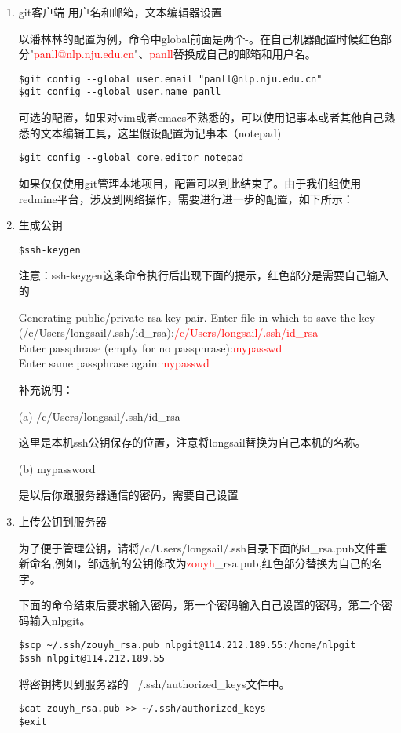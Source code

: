 \begin{enumerate}
\item git客户端 用户名和邮箱，文本编辑器设置

以潘林林的配置为例，命令中global前面是两个-。在自己机器配置时候红色部分"\textcolor{red}{panll@nlp.nju.edu.cn}"、\textcolor{red}{panll}替换成自己的邮箱和用户名。

\begin{lstlisting}
$git config --global user.email "panll@nlp.nju.edu.cn"
$git config --global user.name panll
\end{lstlisting}

可选的配置，如果对vim或者emacs不熟悉的，可以使用记事本或者其他自己熟悉的文本编辑工具，这里假设配置为记事本（notepad)
\begin{lstlisting}
$git config --global core.editor notepad
\end{lstlisting}

如果仅仅使用git管理本地项目，配置可以到此结束了。由于我们组使用redmine平台，涉及到网络操作，需要进行进一步的配置，如下所示：

\item 生成公钥

\begin{lstlisting}
$ssh-keygen
\end{lstlisting}
注意：ssh-keygen这条命令执行后出现下面的提示，红色部分是需要自己输入的

Generating public/private rsa key pair.
Enter file in which to save the key (/c/Users/longsail/.ssh/id\_rsa):\textcolor{red}{/c/Users/longsail/.ssh/id\_rsa}\\
Enter passphrase (empty for no passphrase):\textcolor{red}{mypasswd}\\
Enter same passphrase again:\textcolor{red}{mypasswd}

补充说明：

(a) /c/Users/longsail/.ssh/id\_rsa 

这里是本机ssh公钥保存的位置，注意将longsail替换为自己本机的名称。

(b) mypassword 

是以后你跟服务器通信的密码，需要自己设置


\item 上传公钥到服务器

为了便于管理公钥，请将/c/Users/longsail/.ssh目录下面的id\_rsa.pub文件重新命名,例如，邹远航的公钥修改为\textcolor{red}{zouyh}\_rsa.pub,红色部分替换为自己的名字。

下面的命令结束后要求输入密码，第一个密码输入自己设置的密码，第二个密码输入nlpgit。
\begin{lstlisting}
$scp ~/.ssh/zouyh_rsa.pub nlpgit@114.212.189.55:/home/nlpgit
$ssh nlpgit@114.212.189.55
\end{lstlisting}

将密钥拷贝到服务器的 ~/.ssh/authorized\_keys文件中。
\begin{lstlisting}
$cat zouyh_rsa.pub >> ~/.ssh/authorized_keys
$exit
\end{lstlisting}
\end{enumerate}

